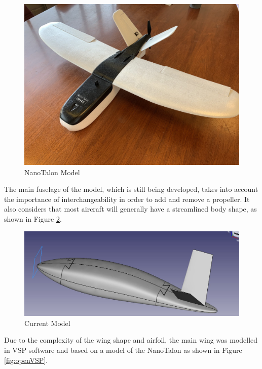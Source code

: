 \begin{figure}[H]
    \centering
    \includegraphics[width=0.7\linewidth]{04_Progress/Figs/DwfPl1HWwAA6nSd.png}
    \caption{NanoTalon Model \cite{NanoTalon2}}
    \label{fig:NanoTalon}
\end{figure}

The main fuselage of the model, which is still being developed, takes into account the importance of interchangeability in order to add and remove a propeller. It also considers that most aircraft will generally have a streamlined body shape, as shown in Figure \ref{fig:model}.

\begin{figure}[H]
    \centering
    \includegraphics[width=\linewidth]{04_Progress/Figs/model.JPG}
    \caption{Current Model}
    \label{fig:model}
\end{figure}

Due to the complexity of the wing shape and airfoil, the main wing was modelled in VSP software and based on a model of the NanoTalon as shown in Figure \ref{fig:openVSP}. 


